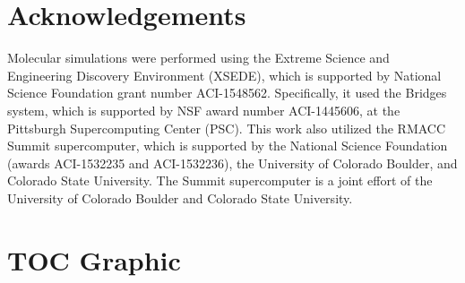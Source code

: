 \documentclass{article}
\begin{document}
  \section*{Acknowledgements}

  Molecular simulations were performed using the Extreme Science and
  Engineering Discovery Environment (XSEDE), which is supported by National
  Science Foundation grant number ACI-1548562. Specifically, it used the Bridges
  system, which is supported by NSF award number ACI-1445606, at the Pittsburgh
  Supercomputing Center (PSC). This work also utilized the RMACC Summit supercomputer,
  which is supported by the National Science Foundation (awards ACI-1532235 and
  ACI-1532236), the University of Colorado Boulder, and Colorado State
  University. The Summit supercomputer is a joint effort of the University of
  Colorado Boulder and Colorado State University.

  \clearpage
  

  \newpage

  \section*{TOC Graphic}
\end{document}
